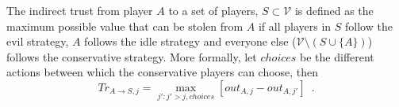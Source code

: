 {}
\begin{definition}
  The indirect trust from player $A$ to a set of players, $S \subset \mathcal{V}$ is defined as the maximum possible
  value that can be stolen from $A$ if all players in $S$ follow the evil strategy, $A$ follows the idle strategy and
  everyone else ($\mathcal{V} \setminus \left(S \cup \{A\}\right)$) follows the conservative strategy.
  More formally, let $choices$ be the different actions between which the conservative players can choose, then
  \begin{equation}
     Tr_{A \rightarrow S, j} = \max\limits_{j' : j' > j, choices}{\left[out_{A,j} - out_{A,j'}\right]} \enspace.
  \end{equation}
\end{definition}
